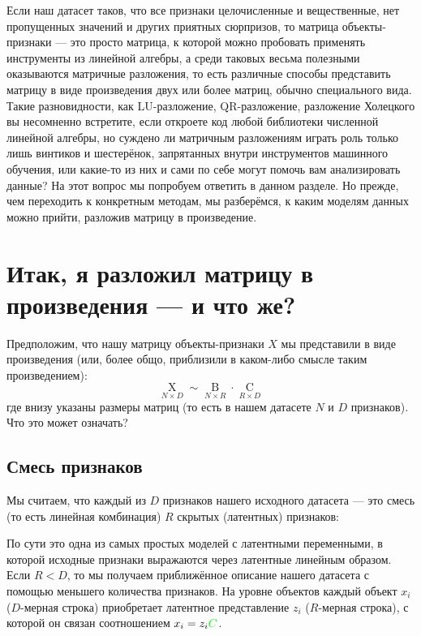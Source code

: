 \documentclass{amsart}
\theoremstyle{definition}
\theoremstyle{remark}
\numberwithin{equation}{section}
\begin{document}
\sloppy

Если наш датасет таков, что все признаки целочисленные и вещественные, нет пропущенных значений и других приятных сюрпризов, то матрица объекты-признаки --- это просто матрица, к которой можно пробовать применять инструменты из линейной алгебры, а среди таковых весьма полезными оказываются матричные разложения, то есть различные способы представить матрицу в виде произведения двух или более матриц, обычно специального вида. Такие разновидности, как LU-разложение, QR-разложение, разложение Холецкого вы несомненно встретите, если откроете код любой библиотеки численной линейной алгебры, но суждено ли матричным разложениям играть роль только лишь винтиков и шестерёнок, запрятанных внутри инструментов машинного обучения, или какие-то из них и сами по себе могут помочь вам анализировать данные? На этот вопрос мы попробуем ответить в данном разделе. Но прежде, чем переходить к конкретным методам, мы разберёмся, к каким моделям данных можно прийти, разложив матрицу в произведение.

\bigskip

\bigskip

\section{Итак, я разложил матрицу в произведения --- и что же?}

Предположим, что нашу матрицу объекты-признаки $X$ мы представили в виде произведения (или, более общо, приблизили в каком-либо смысле таким произведением):
$$\underset{N\times D}{\operatorname{X}} \sim \underset{N\times R}{\operatorname{B}} \cdot \underset{R\times D}{\operatorname{C}}$$
где внизу указаны размеры матриц (то есть в нашем датасете $N$ и $D$ признаков). Что это может означать?

\subsection{Смесь признаков} Мы считаем, что каждый из $D$ признаков нашего исходного датасета --- это смесь (то есть линейная комбинация) $R$ скрытых (латентных) признаков:

\begin{center}
\end{center}

По сути это одна из самых простых моделей с латентными переменными, в которой исходные признаки выражаются через латентные линейным образом. Если $R < D$, то мы получаем приближённое описание нашего датасета с помощью меньшего количества признаков. На уровне объектов каждый объект $x_i$ ($D$-мерная строка) приобретает латентное  представление $z_i$ ($R$-мерная строка), с которой он связан соотношением $x_i = z_i\textcolor{green}{C}$.
\end{document}
